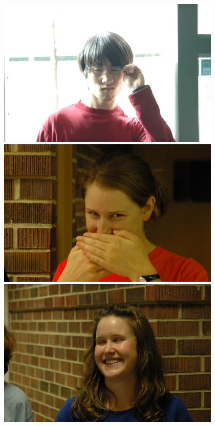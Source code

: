 \begin{figure}
\includegraphics[scale=0.35,clip=true]{figures_cvpr/examples/5/failure/DSC_1669.jpg} 
\includegraphics[scale=0.35,clip=true]{figures_cvpr/examples/5/failure/DSC_1800.jpg} 
\includegraphics[scale=0.35,clip=true]{figures_cvpr/examples/5/failure/DSC_1870.jpg} 

\end{figure}
